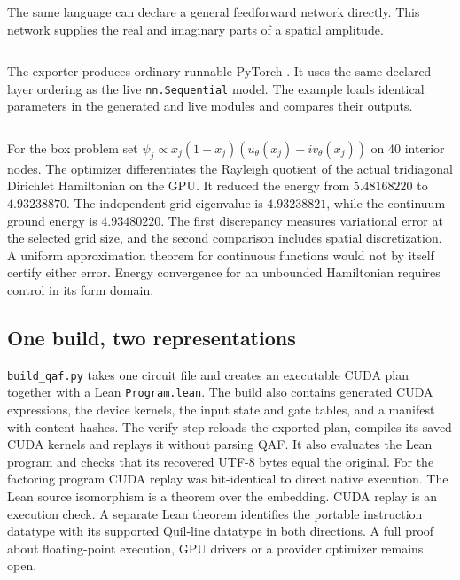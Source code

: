 The same language can declare a general feedforward network directly. This network supplies the real and imaginary parts of a spatial amplitude.
\inputminted{qaf}{../../examples/prefix/wave_net.qaf}
The exporter produces ordinary runnable PyTorch \cite{torch}. It uses the same declared layer ordering as the live \texttt{nn.Sequential} model. The example loads identical parameters in the generated and live modules and compares their outputs.
\inputminted[fontsize=\footnotesize]{python}{../../examples/wave_net.py}
For the box problem set $\psi_j\propto x_j(1-x_j)(u_\theta(x_j)+i v_\theta(x_j))$ on 40 interior nodes. The optimizer differentiates the Rayleigh quotient of the actual tridiagonal Dirichlet Hamiltonian on the GPU. It reduced the energy from $5.48168220$ to $4.93238870$. The independent grid eigenvalue is $4.93238821$, while the continuum ground energy is $4.93480220$. The first discrepancy measures variational error at the selected grid size, and the second comparison includes spatial discretization. A uniform approximation theorem for continuous functions would not by itself certify either error. Energy convergence for an unbounded Hamiltonian requires control in its form domain.

\subsection{One build, two representations}
\texttt{build\_qaf.py} takes one circuit file and creates an executable CUDA plan together with a Lean \texttt{Program.lean}. The build also contains generated CUDA expressions, the device kernels, the input state and gate tables, and a manifest with content hashes. The verify step reloads the exported plan, compiles its saved CUDA kernels and replays it without parsing QAF. It also evaluates the Lean program and checks that its recovered UTF-8 bytes equal the original. For the factoring program CUDA replay was bit-identical to direct native execution. The Lean source isomorphism is a theorem over the embedding. CUDA replay is an execution check. A separate Lean theorem identifies the portable instruction datatype with its supported Quil-line datatype in both directions. A full proof about floating-point execution, GPU drivers or a provider optimizer remains open.

